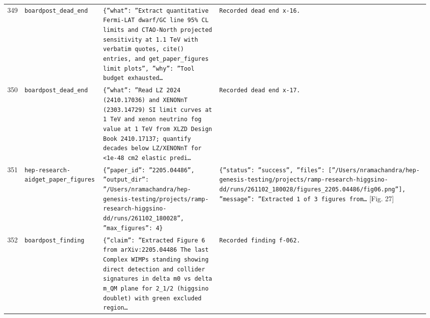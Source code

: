 \documentclass[11pt,a4paper]{article}
\begin{document}
\begin{longtable}{@{}p{}p{}p{}p{}@{}}
349 & \texttt{board}\newline\texttt{post\_\allowbreak{}dead\_\allowbreak{}end} & \texttt{\{''what'':\allowbreak{} ''Extract quantitative Fermi-LAT dwarf/\allowbreak{}GC line 95\% CL limits and CTAO-North projected sensitivity at 1.1 TeV with verbatim quotes,\allowbreak{} cite()\allowbreak{} entries,\allowbreak{} and get\_\allowbreak{}paper\_\allowbreak{}figures limit plots'',\allowbreak{} ''why'':\allowbreak{} ''Tool budget exhausted\ldots{}\allowbreak{}} & \texttt{Recorded dead end x-16.} \\
350 & \texttt{board}\newline\texttt{post\_\allowbreak{}dead\_\allowbreak{}end} & \texttt{\{''what'':\allowbreak{} ''Read LZ 2024 (2410.17036)\allowbreak{} and XENONnT (2303.14729)\allowbreak{} SI limit curves at 1 TeV and xenon neutrino fog value at 1 TeV from XLZD Design Book 2410.17137;\allowbreak{} quantify decades below LZ/\allowbreak{}XENONnT for \textless{}\allowbreak{}1e-48 cm2 elastic predi\ldots{}\allowbreak{}} & \texttt{Recorded dead end x-17.} \\
351 & \texttt{hep-research-aid}\newline\texttt{get\_\allowbreak{}paper\_\allowbreak{}figures} & \texttt{\{''paper\_\allowbreak{}id'':\allowbreak{} ''2205.04486'',\allowbreak{} ''output\_\allowbreak{}dir'':\allowbreak{} ''/\allowbreak{}Users/\allowbreak{}nramachandra/\allowbreak{}hep-genesis-testing/\allowbreak{}projects/\allowbreak{}ramp-research-higgsino-dd/\allowbreak{}runs/\allowbreak{}261102\_\allowbreak{}180028'',\allowbreak{} ''max\_\allowbreak{}figures'':\allowbreak{} 4\}\allowbreak{}} & \texttt{\{''status'':\allowbreak{} ''success'',\allowbreak{} ''files'':\allowbreak{} [''/\allowbreak{}Users/\allowbreak{}nramachandra/\allowbreak{}hep-genesis-testing/\allowbreak{}projects/\allowbreak{}ramp-research-higgsino-dd/\allowbreak{}runs/\allowbreak{}261102\_\allowbreak{}180028/\allowbreak{}figures\_\allowbreak{}2205.04486/\allowbreak{}fig06.png'']\allowbreak{},\allowbreak{} ''message'':\allowbreak{} ''Extracted 1 of 3 figures from\ldots{}\allowbreak{}} [Fig. 27] \\
352 & \texttt{board}\newline\texttt{post\_\allowbreak{}finding} & \texttt{\{''claim'':\allowbreak{} ''Extracted Figure 6 from arXiv:\allowbreak{}2205.04486 The last Complex WIMPs standing showing direct detection and collider signatures in delta m0 vs delta m\_\allowbreak{}QM plane for 2\_\allowbreak{}1/\allowbreak{}2 (higgsino doublet)\allowbreak{} with green excluded region\ldots{}\allowbreak{}} & \texttt{Recorded finding f-062.} \\

\end{longtable}
\end{document}
